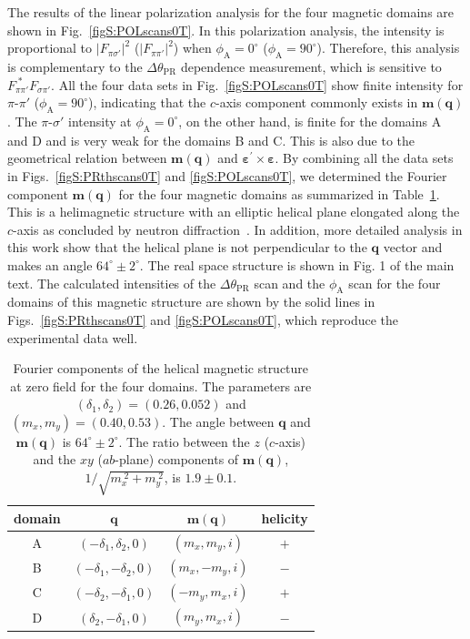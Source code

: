 \documentclass[aps,prb,reprint,superscriptaddress,amsmath,amssymb]{revtex4-2}
\begin{document}
The results of the linear polarization analysis for the four magnetic domains are shown in Fig.~\ref{figS:POLscans0T}. 
In this polarization analysis, the intensity is proportional to $|F_{\pi\sigma'}|^2$ ($|F_{\pi\pi'}|^2$) when $\phi_{\text{A}}=0^{\circ}$ ($\phi_{\text{A}}=90^{\circ}$). Therefore, this analysis is complementary to the $\Delta\theta_{\text{PR}}$ dependence measurement, which is sensitive to $F_{\pi\pi'}^{\;*}F_{\sigma\pi'}$. 
All the four data sets in Fig.~\ref{figS:POLscans0T} show finite intensity for $\pi$-$\pi'$ ($\phi_{\text{A}}=90^{\circ}$), indicating that the $c$-axis component commonly exists in $\bm{m}(\bm{q})$. 
The $\pi$-$\sigma'$ intensity at $\phi_{\text{A}}=0^{\circ}$, on the other hand, is finite for the domains A and D and is very weak for the domains B and C. This is also due to the geometrical relation between $\bm{m}(\bm{q})$ and $\bm{\varepsilon}^{\prime} \times \bm{\varepsilon}$. 
By combining all the data sets in Figs.~\ref{figS:PRthscans0T} and \ref{figS:POLscans0T}, we determined the Fourier component $\bm{m}(\bm{q})$ for the four magnetic domains as summarized in Table~\ref{tbl:mq0T}. 
This is a helimagnetic structure with an elliptic helical plane elongated along the $c$-axis as concluded by neutron diffraction~\cite{Fabreges16}. 
In addition, more detailed analysis in this work show that the helical plane is not perpendicular to the $\bm{q}$ vector and makes an angle $64^{\circ}\pm 2^{\circ}$. 
The real space structure is shown in Fig. 1 of the main text. 
The calculated intensities of the $\Delta\theta_{\text{PR}}$ scan and the $\phi_{\text{A}}$ scan for the four domains of this magnetic structure are shown by the solid lines in Figs.~\ref{figS:PRthscans0T} and \ref{figS:POLscans0T}, which reproduce the experimental data well. 

\begin{table}
\caption{Fourier components of the helical magnetic structure at zero field for the four domains. 
The parameters are $(\delta_1, \delta_2)=(0.26, 0.052)$ and $(m_x, m_y)=(0.40, 0.53)$. 
The angle between $\bm{q}$ and $\bm{m}(\bm{q})$ is $64^{\circ} \pm 2^{\circ}$.  
The ratio between the $z$ ($c$-axis) and the $xy$ ($ab$-plane) components of $\bm{m}(\bm{q})$, $1/\sqrt{m_x^{\;2} + m_y^{\;2}}$, is $1.9 \pm 0.1$. }
\label{tbl:mq0T}
\begin{tabular}{cccc}
\hline
domain & $\bm{q}$ & $\bm{m}(\bm{q})$ & helicity \\
\hline
A & $(-\delta_1, \delta_2, 0)$ & $( m_x, m_y, i)$  & $+$ \\
B & $(-\delta_1, -\delta_2, 0)$ & $( m_x, -m_y, i)$ & $-$  \\
C & $(-\delta_2, -\delta_1, 0)$ & $(-m_y, m_x, i)$ & $+$  \\
D & $( \delta_2, -\delta_1, 0)$ & $( m_y,  m_x,  i)$ & $-$ \\
\hline
\end{tabular}
\end{table}
\end{document}
